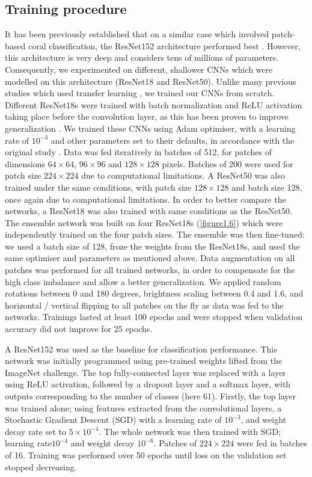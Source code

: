 \subsection{Training procedure}\label{chapitre1_5.1}
It has been previously established that on a similar case which involved patch-based coral classification, the ResNet152 architecture performed best \citep{king_comparison_2018}. However, this architecture is very deep and considers tens of millions of parameters. Consequently, we experimented on different, shallower CNNs which were modelled on this architecture (ResNet18 and ResNet50). Unlike many previous studies which used transfer learning \citep{king_comparison_2018, mahmood_coral_2016, mahmood_deep_2017}, we trained our CNNs from scratch. Different ResNet18s were trained with batch normalization and ReLU activation taking place before the convolution layer, as this has been proven to improve generalization \citep{he_identity_2016}. We trained these CNNs using Adam optimiser, with a learning rate of $10^{-3}$ and other parameters set to their defaults, in accordance with the original study \citep{kingma_adam:_2014}. Data was fed iteratively in batches of 512, for patches of dimensions \(64 \times 64\), \(96 \times 96\) and \(128 \times 128\) pixels. Batches of 200 were used for patch size \(224 \times 224\) due to computational limitations. A ResNet50 was also trained under the same conditions, with patch size \(128 \times 128\) and batch size 128, once again due to computational limitations. In order to better compare the networks, a ResNet18 was also trained with same conditions as the ResNet50. The ensemble network was built on four ResNet18s (\autoref{figure1.6}) which were independently trained on the four patch sizes. The ensemble was then fine-tuned: we used a batch size of 128, froze the weights from the ResNet18s, and used the same optimiser and parameters as mentioned above. Data augmentation on all patches was performed for all trained networks, in order to compensate for the high class imbalance and allow a better generalization. We applied random rotations between 0 and 180 degrees, brightness scaling between 0.4 and 1.6, and horizontal / vertical flipping to all patches on the fly as data was fed to the networks. Trainings lasted at least 100 epochs and were stopped when validation accuracy did not improve for 25 epochs.

A ResNet152 was used as the baseline for classification performance. This network was initially programmed using pre-trained weights lifted from the ImageNet challenge. The top fully-connected layer was replaced with a layer using ReLU activation, followed by a dropout layer and a softmax layer, with outputs corresponding to the number of classes (here 61). Firstly, the top layer was trained alone; using features extracted from the convolutional layers, a Stochastic Gradient Descent (SGD) with a learning rate of $10^{-3}$, and weight decay rate set to $5\times10^{-4}$. The whole network was then trained with SGD; learning rate$10^{-4}$ and weight decay $10^{-6}$. Patches of \(224 \times 224\) were fed in batches of 16. Training was performed over 50 epochs until loss on the validation set stopped decreasing.

